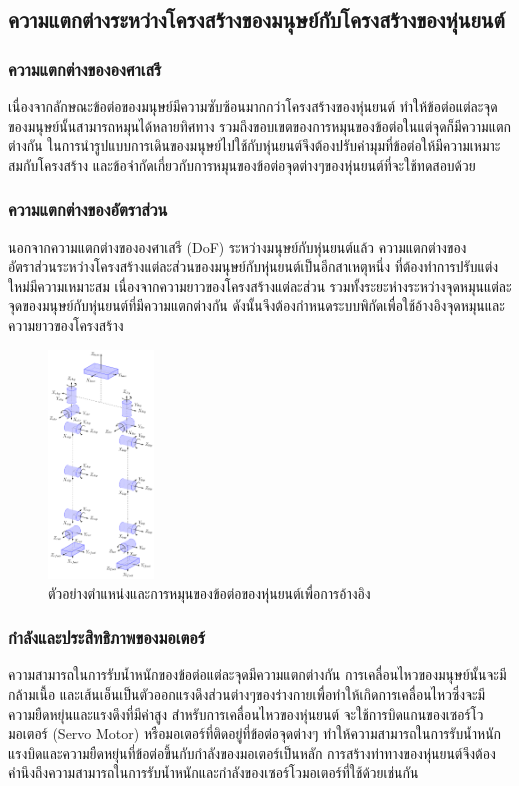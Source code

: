 \subsection{ความแตกต่างระหว่างโครงสร้างของมนุษย์กับโครงสร้างของหุ่นยนต์}

\subsubsection{ความแตกต่างขององศาเสรี}
เนื่องจากลักษณะข้อต่อของมนุษย์มีความซับซ้อนมากกว่าโครงสร้างของหุ่นยนต์
ทำให้ข้อต่อแต่ละจุดของมนุษย์นั้นสามารถหมุนได้หลายทิศทาง รวมถึงขอบเขตของการหมุนของข้อต่อในแต่จุดก็มีความแตกต่างกัน
ในการนำรูปแบบการเดินของมนุษย์ไปใช้กับหุ่นยนต์จึงต้องปรับค่ามุมที่ข้อต่อให้มีความเหมาะสมกับโครงสร้าง
และข้อจำกัดเกี่ยวกับการหมุนของข้อต่อจุดต่างๆของหุ่นยนต์ที่จะใช้ทดสอบด้วย

\subsubsection{ความแตกต่างของอัตราส่วน}
นอกจากความแตกต่างขององศาเสรี (DoF) ระหว่างมนุษย์กับหุ่นยนต์แล้ว
ความแตกต่างของอัตราส่วนระหว่างโครงสร้างแต่ละส่วนของมนุษย์กับหุ่นยนต์เป็นอีกสาเหตุหนึ่ง
ที่ต้องทำการปรับแต่งใหม่มีความเหมาะสม เนื่องจากความยาวของโครงสร้างแต่ละส่วน
รวมทั้งระยะห่างระหว่างจุดหมุนแต่ละจุดของมนุษย์กับหุ่นยนต์ที่มีความแตกต่างกัน
ดังนั้นจึงต้องกำหนดระบบพิกัดเพื่อใช้อ้างอิงจุดหมุนและความยาวของโครงสร้าง
\begin{figure}[htbp]
    \centering
    \includegraphics[width=0.25\textwidth]{chapter2/images/uthai_kinematics.png}
    \caption{ตัวอย่างตำแหน่งและการหมุนของข้อต่อของหุ่นยนต์เพื่อการอ้างอิง}
    \label{fig:robot_frame}
\end{figure}


\subsubsection{กำลังและประสิทธิภาพของมอเตอร์}
ความสามารถในการรับน้ำหนักของข้อต่อแต่ละจุดมีความแตกต่างกัน การเคลื่อนไหวของมนุษย์นั้นจะมีกล้ามเนื้อ
และเส้นเอ็นเป็นตัวออกแรงดึงส่วนต่างๆของร่างกายเพื่อทำให้เกิดการเคลื่อนไหวซึ่งจะมีความยืดหยุ่นและแรงดึงที่มีค่าสูง
สำหรับการเคลื่อนไหวของหุ่นยนต์ จะใช้การบิดแกนของเซอร์โวมอเตอร์ (Servo Motor) หรือมอเตอร์ที่ติดอยู่ที่ข้อต่อจุดต่างๆ
ทำให้ความสามารถในการรับน้ำหนัก แรงบิดและความยืดหยุ่นที่ข้อต่อขึ้นกับกำลังของมอเตอร์เป็นหลัก
การสร้างท่าทางของหุ่นยนต์จึงต้องคำนึงถึงความสามารถในการรับน้ำหนักและกำลังของเซอร์โวมอเตอร์ที่ใช้ด้วยเช่นกัน


